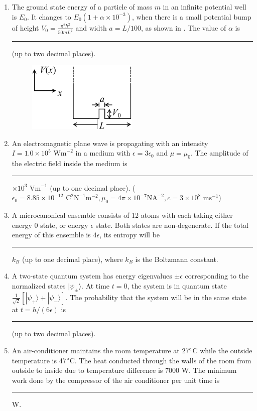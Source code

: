 \documentclass[journal,12pt,onecolumn]{IEEEtran}
\theoremstyle{remark}
\begin{document}
\begin{enumerate}
    \item The ground state energy of a particle of mass $m$ in an infinite potential well is $E_0$. It changes to $E_0(1 + \alpha \times 10^{-3})$, when there is a small potential bump of height $V_0 = \frac{\pi^2\hbar^2}{50mL^2}$ and width $a = L/100$, as shown in . The value of $\alpha$ is \rule{1.5cm}{0.4pt} (up to two decimal places).
    \begin{figure}[H]
        \centering
        \caption{} \label{fig:57} \includegraphics{figs/57.png}
    \end{figure}\hfill{}

    \item An electromagnetic plane wave is propagating with an intensity $I = 1.0 \times 10^5 \text{ Wm}^{-2}$ in a medium with $\epsilon = 3\epsilon_0$ and $\mu = \mu_0$. The amplitude of the electric field inside the medium is \rule{1.5cm}{0.4pt} $\times 10^3 \text{ Vm}^{-1}$ (up to one decimal place). ($\epsilon_0 = 8.85 \times 10^{-12} \text{ C}^2\text{N}^{-1}\text{m}^{-2}, \mu_0 = 4\pi \times 10^{-7} \text{NA}^{-2}, c = 3 \times 10^8 \text{ ms}^{-1}$)\hfill{}

    \item A microcanonical ensemble consists of 12 atoms with each taking either energy 0 state, or energy $\epsilon$ state. Both states are non-degenerate. If the total energy of this ensemble is $4\epsilon$, its entropy will be \rule{1.5cm}{0.4pt} $k_B$ (up to one decimal place), where $k_B$ is the Boltzmann constant.\hfill{}

    \item A two-state quantum system has energy eigenvalues $\pm\epsilon$ corresponding to the normalized states $|\psi_{\pm}\rangle$. At time $t=0$, the system is in quantum state $\frac{1}{\sqrt{2}}[|\psi_+\rangle + |\psi_-\rangle]$. The probability that the system will be in the same state at $t = h/(6\epsilon)$ is \rule{1.5cm}{0.4pt} (up to two decimal places).\hfill{}

    \item An air-conditioner maintains the room temperature at 27$\degree$C while the outside temperature is 47$\degree$C. The heat conducted through the walls of the room from outside to inside due to temperature difference is 7000 W. The minimum work done by the compressor of the air conditioner per unit time is \rule{1.5cm}{0.4pt} W.\hfill{}


\end{enumerate}
\end{document}
